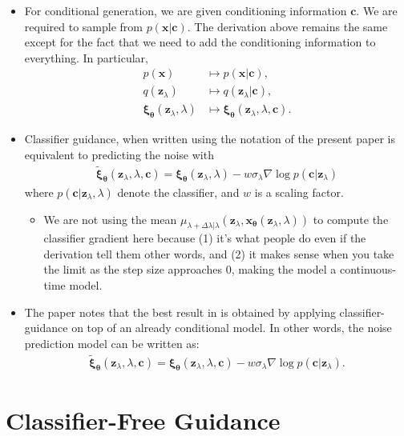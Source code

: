 \documentclass[10pt]{article}
\newcommand{\ve}[1]{\mathbf{#1}}
\newcommand{\ves}[1]{\boldsymbol{#1}}
\begin{document}
\begin{itemize}
  \item For conditional generation, we are given conditioning information $\ve{c}$. We are required to sample from $p(\ve{x}|\ve{c})$. The derivation above remains the same except for the fact that we need to add the conditioning information to everything. In particular,
  \begin{align*}
    p(\ve{x}) &\mapsto p(\ve{x}|\ve{c}), \\
    q(\ve{z}_\lambda) &\mapsto q(\ve{z}_{\lambda}|\ve{c}), \\
    \ve{\xi}_{\ves{\theta}}(\ve{z}_\lambda, \lambda) &\mapsto \ve{\xi}_{\ves{\theta}}(\ve{z}_\lambda, \lambda, \ve{c}). 
  \end{align*}

  \item Classifier guidance, when written using the notation of the present paper is equivalent to predicting the noise with
  \begin{align*}
    \widetilde{\ves{\xi}}_{\ves{\theta}}(\ve{z}_\lambda, \lambda, \ve{c})
    = \ves{\xi}_{\ves{\theta}}(\ve{z}_\lambda, \lambda) - w\sigma_\lambda \nabla \log p(\ve{c}|\ve{z}_\lambda)
  \end{align*}
  where $p(\ve{c}|\ve{z}_\lambda, \lambda)$ denote the classifier, and $w$ is a scaling factor.
  \begin{itemize}
    \item We are not using the mean $\mu_{\lambda + \Delta\lambda|\lambda}(\ve{z}_\lambda, \ve{x}_{\ves{\theta}}(\ve{z}_\lambda,\lambda))$ to compute the classifier gradient here because (1) it's what people do even if the derivation tell them other words, and (2) it makes sense when you take the limit as the step size approaches $0$, making the model a continuous-time model.
  \end{itemize}

  \item The paper notes that the best result in \cite{Dhariwal:2021} is obtained by applying classifier-guidance on top of an already conditional model. In other words, the noise prediction model can be written as:
  \begin{align} \label{eq:classifier-guidance}
    \widetilde{\ves{\xi}}_{\ves{\theta}}(\ve{z}_\lambda, \lambda, \ve{c})
    = \ves{\xi}_{\ves{\theta}}(\ve{z}_\lambda, \lambda, \ve{c}) - w\sigma_\lambda \nabla \log p(\ve{c}|\ve{z}_\lambda).
  \end{align}
\end{itemize}

\section{Classifier-Free Guidance}
\end{document}
